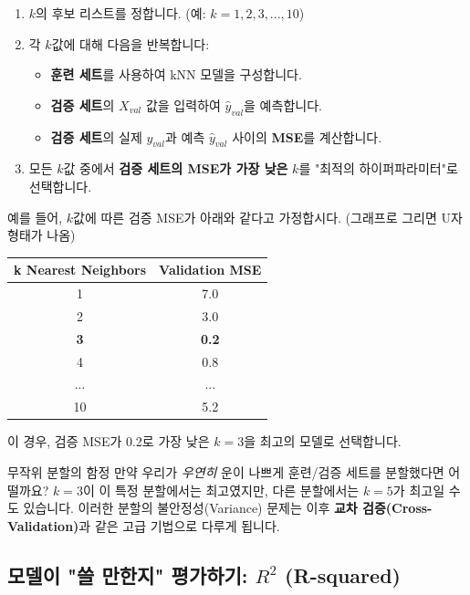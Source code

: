 \documentclass[11pt,a4paper]{book}
\theoremstyle{definition}
\begin{document}
\begin{enumerate}
    \item $k$의 후보 리스트를 정합니다. (예: $k = 1, 2, 3, ..., 10$)
    \item 각 $k$값에 대해 다음을 반복합니다:
        \begin{itemize}
            \item \textbf{훈련 세트}를 사용하여 kNN 모델을 구성합니다.
            \item \textbf{검증 세트}의 $X_{val}$ 값을 입력하여 $\hat{y}_{val}$을 예측합니다.
            \item \textbf{검증 세트}의 실제 $y_{val}$과 예측 $\hat{y}_{val}$ 사이의 \textbf{MSE}를 계산합니다.
        \end{itemize}
    \item 모든 $k$값 중에서 \textbf{검증 세트의 MSE가 가장 낮은} $k$를 "최적의 하이퍼파라미터"로 선택합니다.
\end{enumerate}

예를 들어, $k$값에 따른 검증 MSE가 아래와 같다고 가정합시다. (그래프로 그리면 U자 형태가 나옴)

\begin{center}
\begin{tabular}{c|c}
\toprule
\textbf{k Nearest Neighbors} & \textbf{Validation MSE} \\
\midrule
1 & 7.0 \\
2 & 3.0 \\
\textbf{3} & \textbf{0.2} \\ %
4 & 0.8 \\
... & ... \\
10 & 5.2 \\
\bottomrule
\end{tabular}
\end{center}

이 경우, 검증 MSE가 0.2로 가장 낮은 $k=3$을 최고의 모델로 선택합니다.

\begin{cautionbox}{무작위 분할의 함정}
만약 우리가 \textit{우연히} 운이 나쁘게 훈련/검증 세트를 분할했다면 어떨까요?
$k=3$이 이 특정 분할에서는 최고였지만, 다른 분할에서는 $k=5$가 최고일 수도 있습니다.
이러한 분할의 불안정성(Variance) 문제는 이후 \textbf{교차 검증(Cross-Validation)}과 같은 고급 기법으로 다루게 됩니다.
\end{cautionbox}

\subsection{모델이 "쓸 만한지" 평가하기: $R^2$ (R-squared)}
\end{document}

